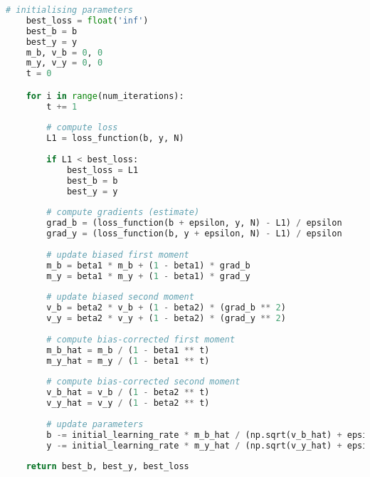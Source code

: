 \begin{appendices}
\begin{lstlisting}[language=Python, caption= null]
	# initialising parameters
    best_loss = float('inf')
    best_b = b
    best_y = y
    m_b, v_b = 0, 0
    m_y, v_y = 0, 0
    t = 0

    for i in range(num_iterations):
        t += 1
        
        # compute loss
        L1 = loss_function(b, y, N)
        
        if L1 < best_loss:
            best_loss = L1
            best_b = b
            best_y = y
        
        # compute gradients (estimate)
        grad_b = (loss_function(b + epsilon, y, N) - L1) / epsilon
        grad_y = (loss_function(b, y + epsilon, N) - L1) / epsilon
        
        # update biased first moment
        m_b = beta1 * m_b + (1 - beta1) * grad_b
        m_y = beta1 * m_y + (1 - beta1) * grad_y
        
        # update biased second moment
        v_b = beta2 * v_b + (1 - beta2) * (grad_b ** 2)
        v_y = beta2 * v_y + (1 - beta2) * (grad_y ** 2)
        
        # compute bias-corrected first moment
        m_b_hat = m_b / (1 - beta1 ** t)
        m_y_hat = m_y / (1 - beta1 ** t)
        
        # compute bias-corrected second moment
        v_b_hat = v_b / (1 - beta2 ** t)
        v_y_hat = v_y / (1 - beta2 ** t)
        
        # update parameters
        b -= initial_learning_rate * m_b_hat / (np.sqrt(v_b_hat) + epsilon)
        y -= initial_learning_rate * m_y_hat / (np.sqrt(v_y_hat) + epsilon)
       
    return best_b, best_y, best_loss
\end{lstlisting}

  
\end{appendices}